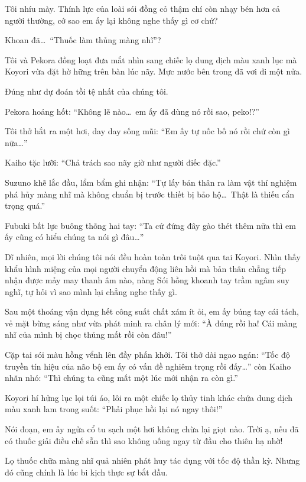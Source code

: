 \documentclass[../main.tex]{subfiles}
\begin{document}
Tôi nhíu mày. Thính lực của loài sói đồng cỏ thậm chí còn nhạy bén hơn cả người thường, cớ sao em ấy lại không nghe thấy gì cơ chứ?

Khoan đã\dots\ ``Thuốc làm thủng màng nhĩ''?

Tôi và Pekora đồng loạt đưa mắt nhìn sang chiếc lọ dung dịch màu xanh lục mà Koyori vừa đặt hờ hững trên bàn lúc nãy. Mực nước bên trong đã vơi đi một nửa.


Đúng như dự đoán tồi tệ nhất của chúng tôi.

Pekora hoảng hốt: ``Không lẽ nào\dots\ em ấy đã dùng nó rồi sao, peko!?''

Tôi thở hắt ra một hơi, day day sống mũi: ``Em ấy tự nốc bố nó rồi chứ còn gì nữa\dots''

Kaiho tặc lưỡi: ``Chả trách sao nãy giờ như người điếc đặc.''

Suzuno khẽ lắc đầu, lẩm bẩm ghi nhận: ``Tự lấy bản thân ra làm vật thí nghiệm phá hủy màng nhĩ mà không chuẩn bị trước thiết bị bảo hộ\dots\ Thật là thiếu cẩn trọng quá.''

Fubuki bất lực buông thõng hai tay: ``Ta cứ đứng đây gào thét thêm nữa thì em ấy cũng có hiểu chúng ta nói gì đâu\dots''

Dĩ nhiên, mọi lời chúng tôi nói đều hoàn toàn trôi tuột qua tai Koyori. Nhìn thấy khẩu hình miệng của mọi người chuyển động liên hồi mà bản thân chẳng tiếp nhận được mảy may thanh âm nào, nàng Sói hồng khoanh tay trầm ngâm suy nghĩ, tự hỏi vì sao mình lại chẳng nghe thấy gì.

Sau một thoáng vận dụng hết công suất chất xám ít ỏi, em ấy búng tay cái tách, vẻ mặt bừng sáng như vừa phát minh ra chân lý mới: ``À đúng rồi ha! Cái màng nhĩ của mình bị chọc thủng mất rồi còn đâu!''

Cặp tai sói màu hồng vểnh lên đầy phấn khởi. Tôi thở dài ngao ngán: ``Tốc độ truyền tín hiệu của não bộ em ấy có vấn đề nghiêm trọng rồi đấy\dots'' còn Kaiho nhăn nhó: ``Thì chúng ta cũng mất một lúc mới nhận ra còn gì.''

Koyori hí hửng lục lọi túi áo, lôi ra một chiếc lọ thủy tinh khác chứa dung dịch màu xanh lam trong suốt: ``Phải phục hồi lại nó ngay thôi!''

Nói đoạn, em ấy ngửa cổ tu sạch một hơi không chừa lại giọt nào. Trời ạ, nếu đã có thuốc giải điều chế sẵn thì sao không uống ngay từ đầu cho thiên hạ nhờ!

Lọ thuốc chữa màng nhĩ quả nhiên phát huy tác dụng với tốc độ thần kỳ. Nhưng đó cũng chính là lúc bi kịch thực sự bắt đầu.
\end{document}
